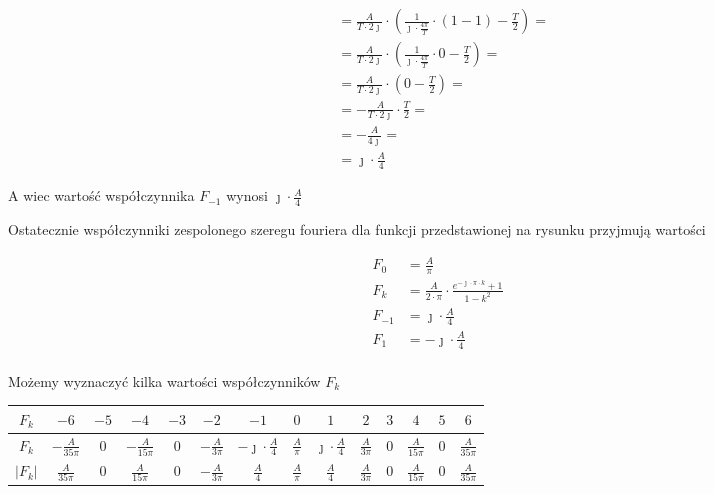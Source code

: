 \begin{task}
\begin{align*}
&=\frac{A}{T\cdot 2\jmath} \cdot \left( \frac{1}{\jmath \cdot \frac{4\pi}{T}} \cdot \left( 1 - 1\right) - \frac{T}{2}\right)=\\
&=\frac{A}{T\cdot 2\jmath} \cdot \left( \frac{1}{\jmath \cdot \frac{4\pi}{T}} \cdot 0 - \frac{T}{2}\right)=\\
&=\frac{A}{T\cdot 2\jmath} \cdot \left( 0 - \frac{T}{2}\right)=\\
&=-\frac{A}{T\cdot 2\jmath} \cdot \frac{T}{2} =\\
&=-\frac{A}{4 \jmath} =\\
&=\jmath \cdot \frac{A}{4} 
\end{align*}

A wiec wartość współczynnika $F_{-1}$ wynosi $\jmath \cdot \frac{A}{4}$


Ostatecznie współczynniki zespolonego szeregu fouriera dla funkcji przedstawionej na rysunku przyjmują wartości

\begin{align*}
F_0&=\frac{A}{\pi}\\
F_k&=\frac{A}{2 \cdot \pi} \cdot \frac{e^{-\jmath \cdot \pi \cdot k}+1}{1-k^2}\\
F_{-1}&=\jmath \cdot \frac{A}{4}\\
F_{1}&=-\jmath \cdot \frac{A}{4}\\
\end{align*}

Możemy wyznaczyć kilka wartości współczynników $F_k$

\begin{table}[H]
  \centering  
  \begin{tabular}{|c|c|c|c|c|c|c|c|c|c|c|c|c|c|}
    \hline 
    $F_k$ & $-6$ & $-5$ & $-4$ & $-3$ & $-2$ & $-1$ & $0$& $1$& $2$& $3$& $4$& $5$ & $6$\\ 
    \hline 
    $F_k$ & $-\frac{A}{35\pi}$ & $0$ & $-\frac{A}{15\pi}$ & $0$ & $-\frac{A}{3\pi}$ & $-\jmath \cdot \frac{A}{4}$ & $\frac{A}{\pi}$ & $\jmath \cdot \frac{A}{4}$ & $\frac{A}{3\pi}$ & $0$ & $\frac{A}{15\pi}$ & $0$ & $\frac{A}{35\pi}$\\ 
    \hline 
    $\left|F_k\right|$ & $\frac{A}{35\pi}$ & $0$ & $\frac{A}{15\pi}$ & $0$ & $-\frac{A}{3\pi}$ & $\frac{A}{4}$ & $\frac{A}{\pi}$ & $\frac{A}{4}$ & $\frac{A}{3\pi}$ & $0$ & $\frac{A}{15\pi}$ & $0$ & $\frac{A}{35\pi}$\\ 
    \hline 
  \end{tabular} 
\end{table}


\end{task}
